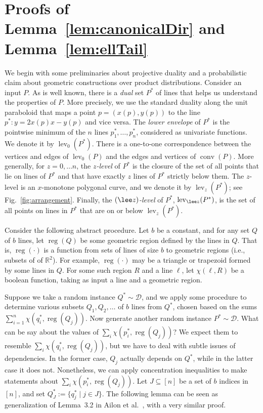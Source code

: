 \documentclass[letterpaper,11pt]{article}
\newcommand{\etal}{et al.}
\newcommand{\R}{\mathbb{R}}
\DeclareMathOperator{\UH}{conv}
\DeclareMathOperator{\reg}{reg}
\DeclareMathOperator{\lev}{lev}
\newcommand{\cD}{\mathcal{D}}
\begin{document}
\section{Proofs of 
  Lemma~\ref{lem:canonicalDir} and 
  Lemma~\ref{lem:ellTail}}
\label{sec:lproofs}

We begin with some preliminaries
about projective duality and 
a probabilistic claim
about geometric constructions 
over product distributions.
Consider an input $P$.
As is well known, there is a 
\emph{dual} set $P^*$ of lines
that helps us understand 
the properties of $P$. More 
precisely, we use the standard
duality along the unit paraboloid 
that maps a point $p = (x(p), y(p))$ 
to the line $p^* : y = 2x(p)x -y(p)$
and vice versa. The \emph{lower envelope} 
of $P^*$ is the
pointwise minimum of the $n$ 
lines $p_1^*, \dots, p_n^*$, 
considered as univariate functions. 
We denote it by $\lev_0(P^*)$.
There is a one-to-one correspondence 
between the vertices and edges of 
$\lev_0(P)$ and the edges and 
vertices of $\UH(P)$. 
More generally, for $z = 0, \ldots n$, 
the \emph{$z$-level} of $P^*$ is 
the closure of the set of all points 
that lie on lines of $P^*$ and that 
have exactly $z$ lines of $P^*$ strictly 
below them.  The $z$-level is 
an $x$-monotone polygonal curve, 
and we denote it by $\lev_z(P^*)$; 
see Fig.~\ref{fig:arrangement}.
Finally, the \emph{$(\lee z)$-level} 
of $P^*$, $\lev_{\lee z}(P^*)$, is the
set of all points on lines in $P^*$ that 
are on or below $\lev_z(P^*)$. 

Consider the following abstract 
procedure. Let $b$ be a constant,
and for any set $Q$ of $b$ lines, 
let $\reg(Q)$ be some geometric region
defined by the lines in $Q$.
That is, $\reg(\cdot)$ is a function
from sets of lines of size $b$ to 
geometric regions (i.e., subsets of
of $\R^2$). For example, $\reg(\cdot)$
may be a triangle or trapezoid formed 
by some lines in $Q$. For some such 
region $R$ and a line $\ell$, let 
$\chi(\ell,R)$ be a boolean
function, taking as input a line 
and a geometric region.

Suppose we take a random 
instance $Q^* \sim \cD$, and we 
apply some procedure to determine 
various subsets $Q_1, Q_2, \ldots$ 
of $b$ lines from $Q^*$, 
chosen based on 
the sums  
$\sum_{i=1}^n \chi(q^*_i,\reg(Q_j))$.
Now generate another random 
instance $P^* \sim \cD$. What
can be say about the values of 
$\sum_i \chi(p^*_i,\reg(Q_j))$? 
We expect them to resemble 
$\sum_i \chi(q^*_i,\reg(Q_j))$, 
but we have to deal with
subtle issues of dependencies. 
In the former case, $Q_j$ actually 
depends on $Q^*$, while in the 
latter case it does not. 
Nonetheless, we can apply 
concentration inequalities
to make statements about 
$\sum_i \chi(p^*_i,\reg(Q_j))$.
Let $J \subseteq [n]$ be a set 
of $b$ indices in $[n]$, and 
set $Q^*_J := \{q^*_j \mid j \in J\}$.
The following lemma can be 
seen as generalization of Lemma~3.2 in 
Ailon \etal~\cite{AilonCCLMS11}, with
a very similar proof.
\end{document}

